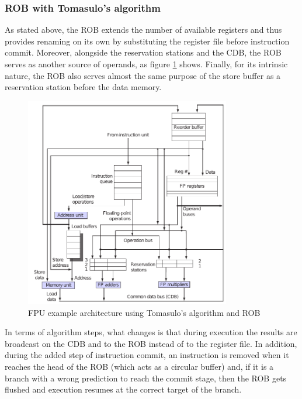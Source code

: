\subsubsection{\acs{ROB} with Tomasulo's algorithm}
As stated above, the \ac{ROB} extends the number of available registers and thus provides renaming on its own by substituting the register file before instruction commit. Moreover, alongside the reservation stations and the \ac{CDB}, the \ac{ROB} serves as another source of operands, as figure \ref{fig:robtomasulo} shows. Finally, for its intrinsic nature, the \ac{ROB} also serves almost the same purpose of the store buffer as a reservation station before the data memory.
\begin{figure}[hbtp]
  \centering
  \includegraphics[width=0.8\textwidth]{img/robtomasulo.pdf}
  \caption{\acs{FPU} example architecture using Tomasulo's algorithm and \acs{ROB} \cite[p.~210]{hennessy17}}
  \label{fig:robtomasulo}
\end{figure}

In terms of algorithm steps, what changes is that during execution the results are broadcast on the \ac{CDB} and to the \ac{ROB} instead of to the register file. In addition, during the added step of instruction commit, an instruction is removed when it reaches the head of the \ac{ROB} (which acts as a circular buffer) and, if it is a branch with a wrong prediction to reach the commit stage, then the \ac{ROB} gets flushed and execution resumes at the correct target of the branch.

